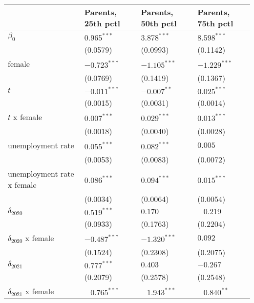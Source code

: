 \begin{tabular}{llll}
\toprule
{} & Parents, 25th pctl & Parents, 50th pctl & Parents, 75th pctl \\
\midrule
$\beta_0$                  &      $0.965^{***}$ &      $3.878^{***}$ &      $8.598^{***}$ \\
                           &           (0.0579) &           (0.0993) &           (0.1142) \\
female                     &     $-0.723^{***}$ &     $-1.105^{***}$ &     $-1.229^{***}$ \\
                           &           (0.0769) &           (0.1419) &           (0.1367) \\
$t$                        &     $-0.011^{***}$ &      $-0.007^{**}$ &      $0.025^{***}$ \\
                           &           (0.0015) &           (0.0031) &           (0.0014) \\
$t$ x female               &      $0.007^{***}$ &      $0.029^{***}$ &      $0.013^{***}$ \\
                           &           (0.0018) &           (0.0040) &           (0.0028) \\
unemployment rate          &      $0.055^{***}$ &      $0.082^{***}$ &            $0.005$ \\
                           &           (0.0053) &           (0.0083) &           (0.0072) \\
unemployment rate x female &      $0.086^{***}$ &      $0.094^{***}$ &      $0.015^{***}$ \\
                           &           (0.0034) &           (0.0064) &           (0.0054) \\
$\delta_{2020}$            &      $0.519^{***}$ &            $0.170$ &           $-0.219$ \\
                           &           (0.0933) &           (0.1763) &           (0.2204) \\
$\delta_{2020}$ x female   &     $-0.487^{***}$ &     $-1.320^{***}$ &            $0.092$ \\
                           &           (0.1524) &           (0.2308) &           (0.2075) \\
$\delta_{2021}$            &      $0.777^{***}$ &            $0.403$ &           $-0.267$ \\
                           &           (0.2079) &           (0.2578) &           (0.2548) \\
$\delta_{2021}$ x female   &     $-0.765^{***}$ &     $-1.943^{***}$ &      $-0.840^{**}$ \\

\end{tabular}
